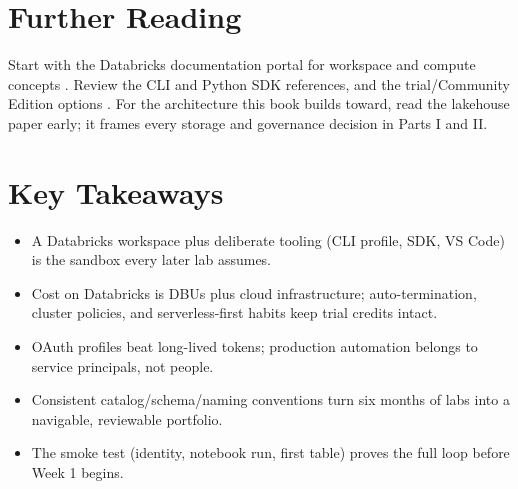 \section{Further Reading}
Start with the Databricks documentation portal for workspace and compute concepts \cite{databricksDocs,databricksWorkspace,databricksCompute}. Review the CLI \cite{databricksCLI} and Python SDK \cite{databricksSDK} references, and the trial/Community Edition options \cite{databricksTrial}. For the architecture this book builds toward, read the lakehouse paper \cite{armbrust2021lakehouse} early; it frames every storage and governance decision in Parts I and II.

\section*{Key Takeaways}
\begin{itemize}
    \item A Databricks workspace plus deliberate tooling (CLI profile, SDK, VS Code) is the sandbox every later lab assumes.
    \item Cost on Databricks is DBUs plus cloud infrastructure; auto-termination, cluster policies, and serverless-first habits keep trial credits intact.
    \item OAuth profiles beat long-lived tokens; production automation belongs to service principals, not people.
    \item Consistent catalog/schema/naming conventions turn six months of labs into a navigable, reviewable portfolio.
    \item The smoke test (identity, notebook run, first table) proves the full loop before Week 1 begins.
\end{itemize}

